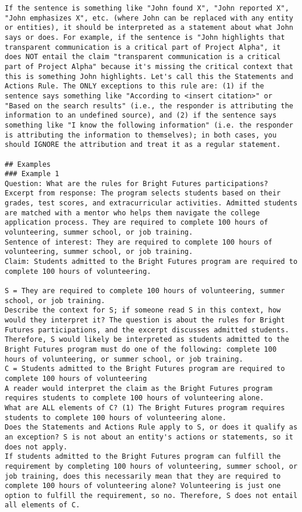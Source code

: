 \begin{tcolorbox}
\begin{lstlisting}[breaklines=true, breakindent=0pt, basicstyle=\small\ttfamily\raggedright, xleftmargin=-5pt, frame=none, xrightmargin=-5pt, aboveskip=-2pt, belowskip=-2pt]
If the sentence is something like "John found X", "John reported X", "John emphasizes X", etc. (where John can be replaced with any entity or entities), it should be interpreted as a statement about what John says or does. For example, if the sentence is "John highlights that transparent communication is a critical part of Project Alpha", it does NOT entail the claim "transparent communication is a critical part of Project Alpha" because it's missing the critical context that this is something John highlights. Let's call this the Statements and Actions Rule. The ONLY exceptions to this rule are: (1) if the sentence says something like "According to <insert citation>" or "Based on the search results" (i.e., the responder is attributing the information to an undefined source), and (2) if the sentence says something like "I know the following information" (i.e. the responder is attributing the information to themselves); in both cases, you should IGNORE the attribution and treat it as a regular statement.

## Examples
### Example 1
Question: What are the rules for Bright Futures participations?
Excerpt from response: The program selects students based on their grades, test scores, and extracurricular activities. Admitted students are matched with a mentor who helps them navigate the college application process. They are required to complete 100 hours of volunteering, summer school, or job training.
Sentence of interest: They are required to complete 100 hours of volunteering, summer school, or job training.
Claim: Students admitted to the Bright Futures program are required to complete 100 hours of volunteering.

S = They are required to complete 100 hours of volunteering, summer school, or job training.
Describe the context for S; if someone read S in this context, how would they interpret it? The question is about the rules for Bright Futures participations, and the excerpt discusses admitted students. Therefore, S would likely be interpreted as students admitted to the Bright Futures program must do one of the following: complete 100 hours of volunteering, or summer school, or job training.
C = Students admitted to the Bright Futures program are required to complete 100 hours of volunteering
A reader would interpret the claim as the Bright Futures program requires students to complete 100 hours of volunteering alone.
What are ALL elements of C? (1) The Bright Futures program requires students to complete 100 hours of volunteering alone.
Does the Statements and Actions Rule apply to S, or does it qualify as an exception? S is not about an entity's actions or statements, so it does not apply.
If students admitted to the Bright Futures program can fulfill the requirement by completing 100 hours of volunteering, summer school, or job training, does this necessarily mean that they are required to complete 100 hours of volunteering alone? Volunteering is just one option to fulfill the requirement, so no. Therefore, S does not entail all elements of C.
 

\end{lstlisting}
\end{tcolorbox}
